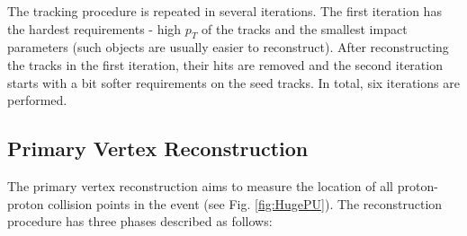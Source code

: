 The tracking procedure is repeated in several iterations.
The first iteration has the hardest requirements - high $p_{T}$ of the tracks
and the smallest impact parameters (such objects are usually easier to reconstruct). After reconstructing the tracks in the first iteration,
their hits are removed and the second iteration starts with a bit softer requirements on the seed tracks. In total, six iterations are performed.
% 

\subsection{Primary Vertex Reconstruction}\label{ssec:vtxReco}

The primary vertex reconstruction aims to measure the location of all proton-proton collision points in the event (see Fig. \ref{fig:HugePU}). The reconstruction procedure has three
phases described as follows\cite{Chatrchyan:2014fea}:

